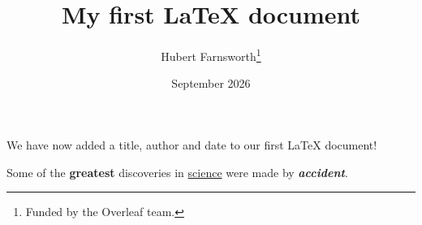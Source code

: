 \documentclass[12pt, letterpaper]{article}
\title{My first LaTeX document}
\author{Hubert Farnsworth\thanks{Funded by the Overleaf team.}}
\date{September 2026}
\begin{document}
\maketitle
We have now added a title, author and date to our first \LaTeX{} document!

Some of the \textbf{greatest} discoveries in \underline{science} were made by \textbf{\textit{accident}}.

\end{document}
